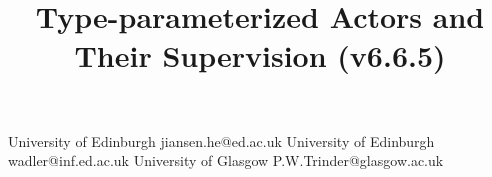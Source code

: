 \documentclass[preprint, authoryear, 10 pt]{sigplanconf}
\begin{document}
\frontmatter          %

\title{Type-parameterized Actors and Their Supervision (v6.6.5) } %

           {University of Edinburgh}
           {jiansen.he@ed.ac.uk}
           {University of Edinburgh}
           {wadler@inf.ed.ac.uk}
           {University of Glasgow}
           {P.W.Trinder@glasgow.ac.uk}





\maketitle
\end{document}
